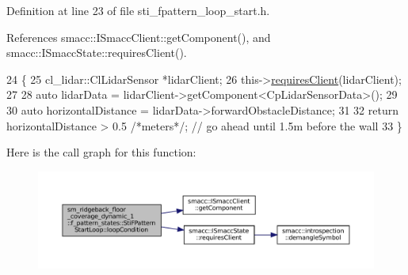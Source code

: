 Definition at line 23 of file sti\+\_\+fpattern\+\_\+loop\+\_\+start.\+h.



References smacc\+::\+I\+Smacc\+Client\+::get\+Component(), and smacc\+::\+I\+Smacc\+State\+::requires\+Client().


\begin{DoxyCode}
24   \{
25     cl\_lidar::ClLidarSensor *lidarClient;
26     this->\hyperlink{classsmacc_1_1ISmaccState_a7f95c9f0a6ea2d6f18d1aec0519de4ac}{requiresClient}(lidarClient);
27 
28     \textcolor{keyword}{auto} lidarData = lidarClient->getComponent<CpLidarSensorData>();
29 
30     \textcolor{keyword}{auto} horizontalDistance = lidarData->forwardObstacleDistance;
31 
32     \textcolor{keywordflow}{return} horizontalDistance > 0.5 \textcolor{comment}{/*meters*/}; \textcolor{comment}{// go ahead until 1.5m before the wall}
33   \}
\end{DoxyCode}
Here is the call graph for this function\+:
\nopagebreak
\begin{figure}[H]
\begin{center}
\leavevmode
\includegraphics[width=350pt]{structsm__ridgeback__floor__coverage__dynamic__1_1_1f__pattern__states_1_1StiFPatternStartLoop_a47c1d55fa4fc153703903a92353e32ac_cgraph}
\end{center}
\end{figure}
\mbox{\label{structsm__ridgeback__floor__coverage__dynamic__1_1_1f__pattern__states_1_1StiFPatternStartLoop_a0125684bbc54b87498fc66d87825ee89}} 
